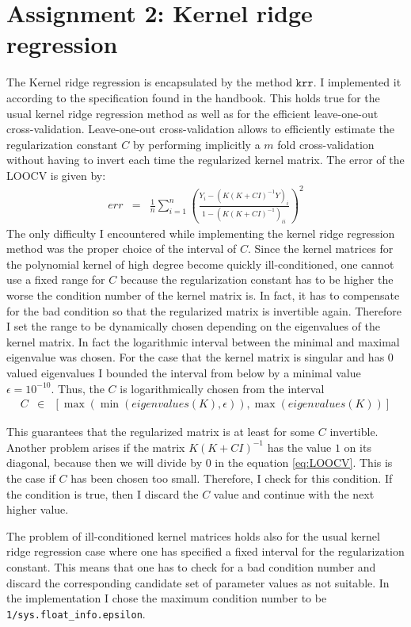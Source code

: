 \documentclass[a4paper, 11pt, titlepage]{article}
\begin{document}
\section*{Assignment 2: Kernel ridge regression}

The Kernel ridge regression is encapsulated by the method $\texttt{krr}$.
I implemented it according to the specification found in the handbook.
This holds true for the usual kernel ridge regression method as well as for the efficient leave-one-out cross-validation.
Leave-one-out cross-validation allows to efficiently estimate the regularization constant $C$ by performing implicitly a $m$ fold cross-validation without having to invert each time the regularized kernel matrix.
The error of the LOOCV is given by:
\begin{eqnarray}
	err &=& \frac{1}{n}\sum_{i=1}^n\left(\frac{Y_i - (K(K+CI)^{-1}Y)_i}{1-(K(K+CI)^{-1})_{ii}} \right)^2 \label{eq:LOOCV}
\end{eqnarray}
The only difficulty I encountered while implementing the kernel ridge regression method was the proper choice of the interval of $C$.
Since the kernel matrices for the polynomial kernel of high degree become quickly ill-conditioned, one cannot use a fixed range for $C$ because the regularization constant has to be higher the worse the condition number of the kernel matrix is.
In fact, it has to compensate for the bad condition so that the regularized matrix is invertible again.
Therefore I set the range to be dynamically chosen depending on the eigenvalues of the kernel matrix.
In fact the logarithmic interval between the minimal and maximal eigenvalue was chosen.
For the case that the kernel matrix is singular and has $0$ valued eigenvalues I bounded the interval from below by a minimal value $\epsilon=10^{-10}$.
Thus, the $C$ is logarithmically chosen from the interval
\begin{eqnarray*}
	C &\in& [\max(\min(eigenvalues(K),\epsilon)), \max(eigenvalues(K)) ]
\end{eqnarray*}

This guarantees that the regularized matrix is at least for some $C$ invertible.
Another problem arises if the matrix $K(K+CI)^{-1}$ has the value $1$ on its diagonal, because then we will divide by $0$ in the equation \eqref{eq:LOOCV}.
This is the case if $C$ has been chosen too small.
Therefore, I check for this condition.
If the condition is true, then I discard the $C$ value and continue with the next higher value.

The problem of ill-conditioned kernel matrices holds also for the usual kernel ridge regression case where one has specified a fixed interval for the regularization constant.
This means that one has to check for a bad condition number and discard the corresponding candidate set of parameter values as not suitable.
In the implementation I chose the maximum condition number to be \texttt{1/sys.float\_info.epsilon}.
\end{document}
